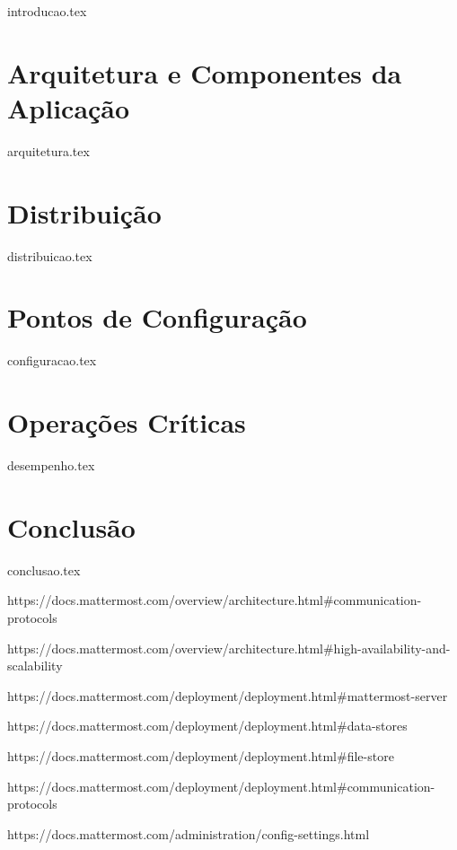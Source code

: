 \documentclass[a4paper, 11pt]{article}
\begin{document}
{introducao.tex}
\newpage

\section{Arquitetura e Componentes da Aplicação}

{arquitetura.tex}

\section{Distribuição}

{distribuicao.tex}

\section{Pontos de Configuração}

{configuracao.tex}

\section{Operações Críticas}

{desempenho.tex}

\section{Conclusão}

{conclusao.tex}
\clearpage

\begin{thebibliography}{}

\small{https://docs.mattermost.com/overview/architecture.html\#communication-protocols}

\small{https://docs.mattermost.com/overview/architecture.html\#high-availability-and-scalability}

\small{https://docs.mattermost.com/deployment/deployment.html\#mattermost-server}

\small{https://docs.mattermost.com/deployment/deployment.html\#data-stores}

\small{https://docs.mattermost.com/deployment/deployment.html\#file-store}

\small{https://docs.mattermost.com/deployment/deployment.html\#communication-protocols}

\small{https://docs.mattermost.com/administration/config-settings.html}

\end{thebibliography}
\end{document}
